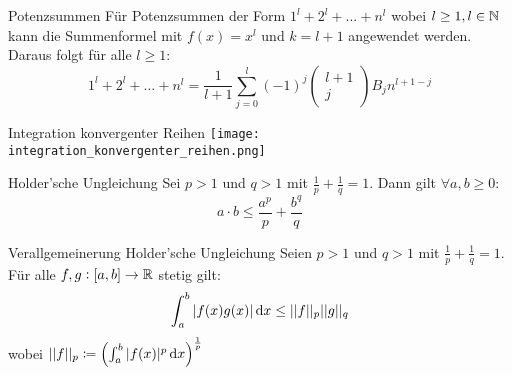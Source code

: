 \begin{highlight}{Potenzsummen}
    Für Potenzsummen der Form $1^l + 2^l + \ldots + n^l$ wobei $l \geq 1, l \in \mathbb{N}$ kann die Summenformel mit $f(x) = x^l$ und $k=l+1$ angewendet werden.
    Daraus folgt für alle $l \geq 1$:
    \begin{equation}
        1^l + 2^l + \ldots + n^l = \frac{1}{l+1} \sum^{l}_{j=0} (-1)^j \begin{pmatrix}l+1\\j\end{pmatrix} B_j n^{l+1-j}
    \end{equation}
\end{highlight}

\begin{concept}{Integration konvergenter Reihen}
    \texttt{[image: integration\_konvergenter\_reihen.png]}
\end{concept}

\begin{lemma}{Holder'sche Ungleichung}
    Sei $p > 1$ und $q > 1$ mit $\frac{1}{p} + \frac{1}{q} =1$.
    Dann gilt $\forall a,b \geq 0$:
    \begin{equation}
        a \cdot b \leq \frac{a^p}{p} + \frac{b^q}{q}
    \end{equation}
\end{lemma}

\begin{theorem}{Verallgemeinerung Holder'sche Ungleichung}
    Seien $p > 1$ und $q> 1$ mit $\frac{1}{p} + \frac{1}{q} = 1$.
    Für alle $f,g : [a,b] \to \mathbb{R}$ stetig gilt:
    \begin{equation}
        \int_{a}^{b} |f(x) g(x)| \dif x \leq ||f||_p ||g||_q
    \end{equation}
    wobei $||f||_p \coloneqq \left( \int_{a}^{b} |f(x)|^p \dif x \right)^{\frac{1}{p}}$
\end{theorem}
